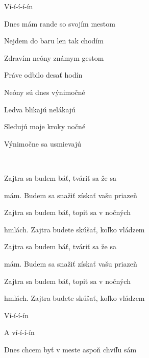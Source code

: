 \begin{song}
 \par
{}Ví-í-í-í-ín  \par
{}     \par

\bigskip

 \par
{} Dnes mám rande so svojím mestom \par
{} Nejdem do baru len tak chodím \par
{} Zdravím neóny známym gestom \par
{} Práve odbilo desať hodín \par

\bigskip

\Refren \par

\bigskip

 Neóny sú dnes výnimočné \par
{} Ledva blikajú nelákajú \par
{} Sledujú moje kroky nočné \par
{} Výnimočne sa usmievajú \par

\bigskip

\Refren\  \par

\bigskip

Zajtra sa budem báť, tváriť sa že sa \par
{}mám. Budem sa snažiť získať vašu priazeň \par
{}Zajtra sa budem báť, topiť sa v nočných \par
{}hmlách. Zajtra budete skúšať, koľko vládzem \par
{}Zajtra sa budem báť, tváriť sa že sa \par
{}mám. Budem sa snažiť získať vašu priazeň \par
{}Zajtra sa budem báť, topiť sa v nočných \par
{}hmlách. Zajtra budete skúšať, koľko vládzem \par

\bigskip

Ví-í-í-ín \par
A ví-í-í-ín \par

\bigskip

Dnes chcem byť v meste aspoň chvíľu sám \par




\end{song}
